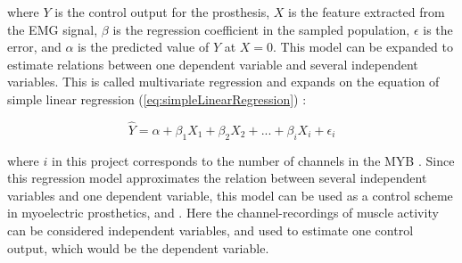 where $Y$ is the control output for the prosthesis, $X$ is the feature extracted from the EMG signal, $\beta$ is the regression coefficient in the sampled population, $\epsilon$ is the error, and $\alpha$ is the predicted value of $Y$ at $X = 0$.
This model can be expanded to estimate relations between one dependent variable and several independent variables. This is called multivariate regression and expands on the equation of simple linear regression (\eqref{eq:simpleLinearRegression}) \cite{Zar2009}:

\begin{equation} \label{eq:multiLinearRegression}
\hat{Y} = \alpha + \beta_1 X_{1} + \beta_2 X_{2} + ... + \beta_i X_{i} + \epsilon_i
\end{equation} 

where $i$ in this project corresponds to the number of channels in the MYB \cite{Zar2009}. Since this regression model approximates the relation between several independent variables and one dependent variable, this model can be used as a control scheme in myoelectric prosthetics, and . Here the channel-recordings of muscle activity can be considered independent variables, and used to estimate one control output, which would be the dependent variable. \cite{Bruun2017}

